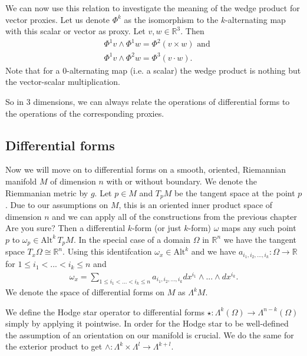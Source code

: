 \documentclass[12pt,a4paper]{article}
\numberwithin{equation}{subsection}
\numberwithin{lemma}{subsection}
\theoremstyle{definition}
\newcommand{\alternating}[2]{ {\text{Alt}^{#1}\,#2} }
\newcommand{\real}{\mathbb{R}}
\begin{document}
We can now use this relation to investigate the meaning of the wedge product
for vector proxies. Let us denote $\Phi^k$ as the isomorphism to the
$k$-alternating map with this scalar or vector as proxy. 
Let $v, w \in  \real^3$. Then 
\begin{align*}
    &\Phi^1 v \wedge \Phi^1 w = \Phi^2 (v\times w) \text{ and} \\
    &\Phi^1 v \wedge \Phi^2 w = \Phi^3 (v \cdot w).
\end{align*}
Note that for a $0$-alternating map (i.e. a scalar) 
the wedge product is nothing but the vector-scalar multiplication.

So in 3 dimensions, we can always relate the operations of differential forms
to the operations of the corresponding proxies. 


\subsection{Differential forms}


Now we will move on to differential forms on a smooth, oriented, Riemannian 
manifold $M$ of dimension $n$ 
with or without boundary. We denote the Riemmanian metric by $g$.
Let $p \in M$ and $T_p M$ be the tangent space at the point $p$. 
Due to our assumptions on $M$, this is an oriented inner product space of 
dimension $n$ and we can apply 
all of the constructions from the previous chapter
{\color{red} Are you sure?}
Then a differential $k$-form (or just $k$-form) $\omega$ maps any 
such point $p$ to $\omega_p \in \alternating{k}{T_p M}$. In the special case 
of a domain $\Omega$ in $\real^n$ we 
have the tangent space $T_x \Omega \cong \real^n$. Using this identifcation 
$\omega_x \in \text{Alt}^k$ and we have $a_{i_1,i_2,...,i_k}: 
\Omega \rightarrow \real$ for $1\leq i_1 < ... < i_k \leq n$ and 
\begin{align*}
    \omega_x = \sum\limits_{1\leq i_1 < ... < i_k \leq n} a_{i_1,i_2,...,i_k}
    dx^{i_1}\wedge ... \wedge dx^{i_k}.
\end{align*}
We denote the space of differential forms on $M$ as $\Lambda^k M$.

We define the Hodge star operator to differential forms 
$\star: \Lambda^k(\Omega) \rightarrow \Lambda^{n-k}(\Omega)$ simply by applying it 
pointwise. In order for 
the Hodge star to be well-defined the assumption of an orientation on our 
manifold is crucial. We do the same for the exterior product to get
$\wedge: \Lambda^k \times \Lambda^l \rightarrow \Lambda^{k+l}$. 
\end{document}
